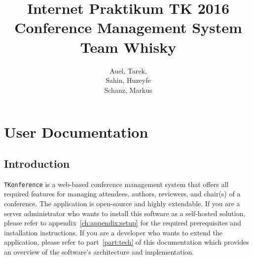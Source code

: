 \documentclass[nochapterpage,nopartpage,noheadingspace,numbersubsubsec,bigchapter,colorback,accentcolor=tud9c,10pt]{tudreport}
\title{Internet Praktikum TK 2016\\ Conference Management System\\ Team Whisky}
\subtitle{Auel, Tarek,\\ Sahin, Huzeyfe\\ Schanz, Markus}
\begin{document}
\maketitle
\tableofcontents



\part{User Documentation}
\label{part:user}

  \chapter{Introduction}
  \label{ch:user:intro}

    \texttt{TKonference} is a web-based conference management system that offers all required features for managing attendees, authors, reviewers, and chair(s) of a conference. The application is open-source and highly extendable. If you are a server administrator who wants to install this software as a self-hosted solution, please refer to appendix~\ref{ch:appendix:setup} for the required prerequisites and installation instructions. If you are a developer who wants to extend the application, please refer to part~\ref{part:tech} of this documentation which provides an overview of the software's architecture and implementation.
\end{document}
